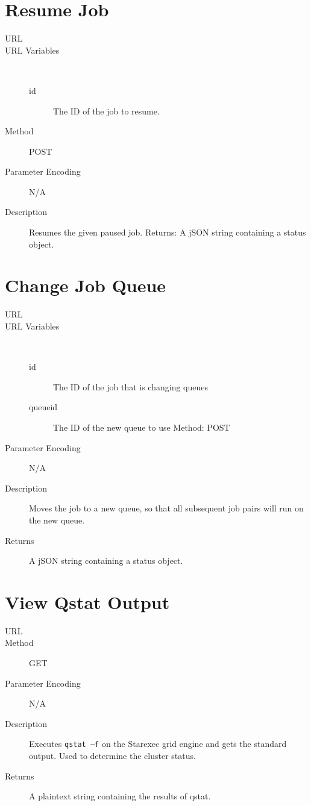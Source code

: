 \section{Resume Job}
\begin{description}
\item [URL] 
\item [URL Variables] \
	\begin{description}
	\item [id]  The ID of the job to resume.
	\end{description}
\item [Method] POST
\item [Parameter Encoding] N/A
\item [Description] Resumes the given paused job. Returns: A jSON string containing a status object.
\end{description}


\section{Change Job Queue}
\begin{description}
\item [URL] 
\item [URL Variables] \
	\begin{description}
	\item [id]  The ID of the job that is changing queues
	\item [queueid]  The ID of the new queue to use Method: POST
	\end{description}
\item [Parameter Encoding] N/A
\item [Description] Moves the job to a new queue, so that all subsequent job pairs will run on the new queue.
\item [Returns] A jSON string containing a status object.
\end{description}


\section{View Qstat Output}
\begin{description}
\item [URL] 
\item [Method] GET
\item [Parameter Encoding] N/A
\item [Description] Executes \texttt{qstat –f} on the Starexec grid engine and gets the standard output. Used to determine the cluster status.
\item [Returns] A plaintext string containing the results of qstat.
\end{description}


